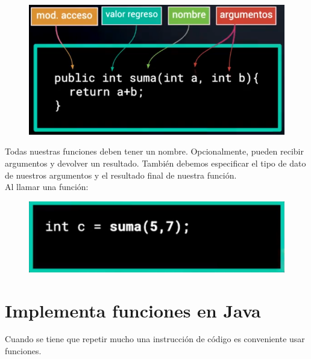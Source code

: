 \documentclass{article}
\begin{document}
\begin{figure}[h!]
  \centering
  \includegraphics[scale=0.75]{./Pictures/025_funcion.png}
\end{figure}

Todas nuestras funciones deben tener un nombre. Opcionalmente, pueden recibir
argumentos y devolver un resultado. También debemos especificar el tipo de dato
de nuestros argumentos y el resultado final de nuestra función.\\

Al llamar una función:

\begin{figure}[h!]
  \centering
  \includegraphics[scale=0.75]{./Pictures/026_funcion.png}
\end{figure}

\newpage

\section{Implementa funciones en Java}%
Cuando se tiene que repetir mucho una instrucción de código es conveniente usar funciones.
\end{document}
